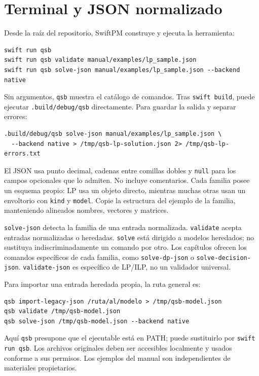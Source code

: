 \section{Terminal y JSON normalizado}
Desde la raíz del repositorio, SwiftPM construye y ejecuta la herramienta:
\begin{lstlisting}
swift run qsb
swift run qsb validate manual/examples/lp_sample.json
swift run qsb solve-json manual/examples/lp_sample.json --backend native
\end{lstlisting}
Sin argumentos, \texttt{qsb} muestra el catálogo de comandos. Tras
\texttt{swift build}, puede ejecutar \texttt{.build/debug/qsb} directamente.
Para guardar la salida y separar errores:
\begin{lstlisting}
.build/debug/qsb solve-json manual/examples/lp_sample.json \
  --backend native > /tmp/qsb-lp-solution.json 2> /tmp/qsb-lp-errors.txt
\end{lstlisting}
El JSON usa punto decimal, cadenas entre comillas dobles y \texttt{null} para
los campos opcionales que lo admiten. No incluye comentarios. Cada familia
posee un esquema propio: LP usa un objeto directo, mientras muchas otras usan
un envoltorio con \texttt{kind} y \texttt{model}. Copie la estructura del ejemplo
de la familia, manteniendo alineados nombres, vectores y matrices.

\texttt{solve-json} detecta la familia de una entrada normalizada.
\texttt{validate} acepta entradas normalizadas o heredadas.
\texttt{solve} está dirigido a modelos heredados; no sustituya indiscriminadamente
un comando por otro. Los capítulos ofrecen los comandos específicos de cada
familia, como \texttt{solve-dp-json} o \texttt{solve-decision-json}.
\texttt{validate-json} es específico de LP/ILP, no un validador universal.

Para importar una entrada heredada propia, la ruta general es:
\begin{lstlisting}
qsb import-legacy-json /ruta/al/modelo > /tmp/qsb-model.json
qsb validate /tmp/qsb-model.json
qsb solve-json /tmp/qsb-model.json --backend native
\end{lstlisting}
Aquí \texttt{qsb} presupone que el ejecutable está en PATH; puede sustituirlo
por \texttt{swift run qsb}. Los archivos originales deben ser accesibles
localmente y usados conforme a sus permisos. Los ejemplos del manual son
independientes de materiales propietarios.

